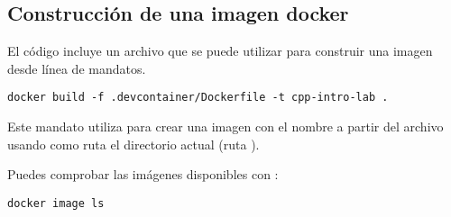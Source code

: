 \subsection{Construcción de una imagen docker}

El código incluye un archivo  que se puede utilizar para
construir una imagen desde línea de mandatos.

\begin{lstlisting}[style=terminal]
docker build -f .devcontainer/Dockerfile -t cpp-intro-lab .
\end{lstlisting}

Este mandato utiliza para crear una imagen con el nombre
 a partir del archivo
 usando como ruta el directorio actual (ruta
).

Puedes comprobar las imágenes disponibles con :

\begin{lstlisting}[style=terminal]
docker image ls
\end{lstlisting}
